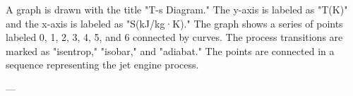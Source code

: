 A graph is drawn with the title "T-s Diagram." The y-axis is labeled as "T(K)" and the x-axis is labeled as "S(kJ/kg·K)." The graph shows a series of points labeled 0, 1, 2, 3, 4, 5, and 6 connected by curves. The process transitions are marked as "isentrop," "isobar," and "adiabat." The points are connected in a sequence representing the jet engine process.

---